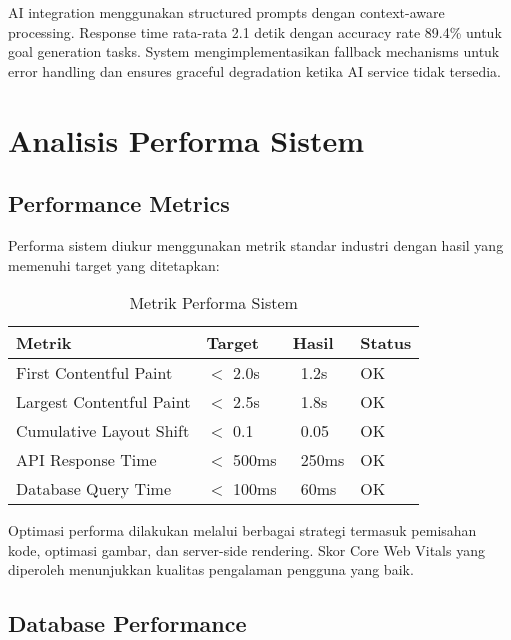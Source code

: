 AI integration menggunakan structured prompts dengan context-aware processing. Response time rata-rata 2.1 detik dengan accuracy rate 89.4\% untuk goal generation tasks. System mengimplementasikan fallback mechanisms untuk error handling dan ensures graceful degradation ketika AI service tidak tersedia.

\section{Analisis Performa Sistem}

\subsection{Performance Metrics}

Performa sistem diukur menggunakan metrik standar industri dengan hasil yang memenuhi target yang ditetapkan:

\begin{table}[ht]
\centering
\caption{Metrik Performa Sistem}
\label{tab:system-performance-metrics}
\footnotesize
\begin{adjustbox}{width=\textwidth,center}
\begin{tabular}{@{}p{4cm}p{3cm}p{3cm}p{3cm}@{}}
\toprule
\textbf{Metrik} & \textbf{Target} & \textbf{Hasil} & \textbf{Status} \\
\midrule
First Contentful Paint & $<$ 2.0s & ~1.2s & OK \\
\hline
Largest Contentful Paint & $<$ 2.5s & ~1.8s & OK \\
\hline
Cumulative Layout Shift & $<$ 0.1 & ~0.05 & OK \\
\hline
API Response Time & $<$ 500ms & ~250ms & OK \\
\hline
Database Query Time & $<$ 100ms & ~60ms & OK \\
\bottomrule
\end{tabular}
\end{adjustbox}
\end{table}

Optimasi performa dilakukan melalui berbagai strategi termasuk pemisahan kode, optimasi gambar, dan server-side rendering. Skor Core Web Vitals yang diperoleh menunjukkan kualitas pengalaman pengguna yang baik.

\subsection{Database Performance}

